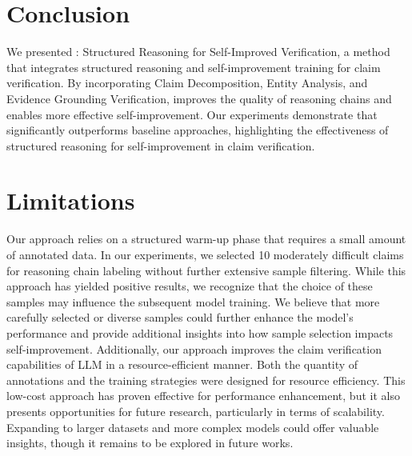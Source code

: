 \section{Conclusion}
We presented \themodel: Structured Reasoning for Self-Improved Verification, a method that integrates structured reasoning and self-improvement training for claim verification. By incorporating Claim Decomposition, Entity Analysis, and Evidence Grounding Verification, \themodel improves the quality of reasoning chains and enables more effective self-improvement. Our experiments demonstrate that \themodel significantly outperforms baseline approaches, highlighting the effectiveness of structured reasoning for self-improvement in claim verification. 


\section{Limitations}
Our approach relies on a structured warm-up phase that requires a small amount of annotated data. In our experiments, we selected 10 moderately difficult claims for reasoning chain labeling without further extensive sample filtering. While this approach has yielded positive results, we recognize that the choice of these samples may influence the subsequent model training. We believe that more carefully selected or diverse samples could further enhance the model's performance and provide additional insights into how sample selection impacts self-improvement. Additionally, our approach improves the claim verification capabilities of LLM in a resource-efficient manner. Both the quantity of annotations and the training strategies were designed for resource efficiency. This low-cost approach has proven effective for performance enhancement, but it also presents opportunities for future research, particularly in terms of scalability. Expanding to larger datasets and more complex models could offer valuable insights, though it remains to be explored in future works.
